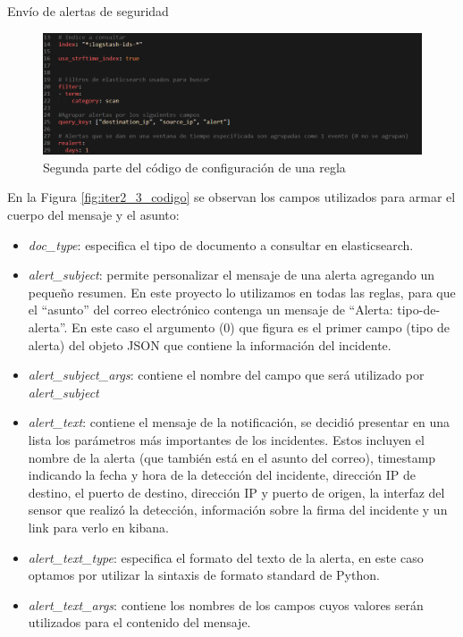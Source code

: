 \begin{section}{Envío de alertas de seguridad}
\begin{itemize}
    \end{itemize}
    \begin{figure}[H]
    \centering
        \includegraphics[width=1\textwidth]{./iteracion_2_imagenes/4-codigoAlerta2.png}
        \caption{Segunda parte del código de configuración de una regla}
        \label{fig:iter2_2_codigo}
    \end{figure}
    \FloatBarrier
    En la Figura \ref{fig:iter2_3_codigo} se observan los campos utilizados para armar el cuerpo del mensaje y el asunto:
    \begin{itemize}
        \item \textit{doc\_type}: especifica el tipo de documento a consultar en elasticsearch.
        \item \textit{alert\_subject}: permite personalizar el mensaje de una alerta agregando un pequeño resumen. En este proyecto lo utilizamos en todas las reglas, para que el “asunto” del correo electrónico contenga un mensaje de “Alerta: tipo-de-alerta”. En este caso el argumento ({0}) que figura es el primer campo (tipo de alerta) del objeto JSON que contiene la información del incidente.
        \item \textit{alert\_subject\_args}: contiene el nombre del campo que será utilizado por \textit{alert\_subject}
        \item \textit{alert\_text}: contiene el mensaje de la notificación, se decidió presentar en una lista los parámetros más importantes de los incidentes. Estos incluyen el nombre de la alerta (que también está en el asunto del correo), timestamp indicando la fecha y hora de la detección del incidente, dirección IP de destino, el puerto de destino, dirección IP y puerto de origen, la interfaz del sensor que realizó la detección, información sobre la firma del incidente y un link para verlo en kibana.
        \item \textit{alert\_text\_type}: especifica el formato del texto de la alerta, en este caso optamos por utilizar la sintaxis de formato standard de Python.
        \item \textit{alert\_text\_args}: contiene los nombres de los campos cuyos valores serán utilizados para el contenido del mensaje.

\end{itemize}
\end{section}
